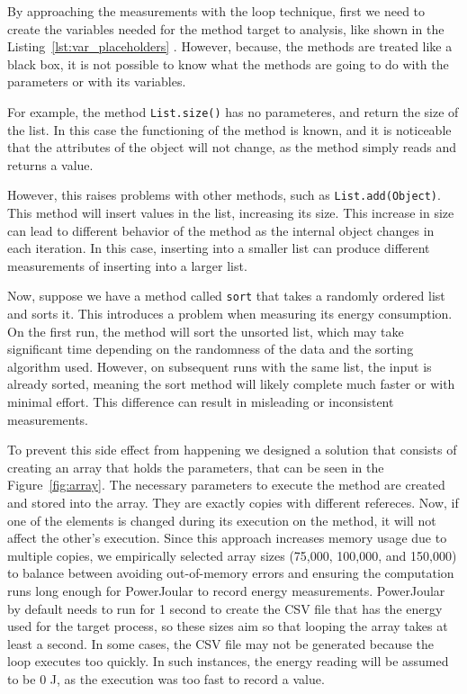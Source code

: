 By approaching the measurements with the loop technique, first we need to create the variables needed for the method target to analysis, like shown in the Listing~\ref{lst:var_placeholders} . However, because, the methods are treated like a black box, it is not possible to know what the methods are going to do with the parameters or with its variables. {\color{blue} For example, the method \texttt{List.size()} has no parameteres, and return the size of the list. In this case the functioning of the method is known, and it is noticeable that the attributes of the object will not change, as the method simply reads and returns a value.

However, this raises problems with other methods, such as \texttt{List.add(Object)}. This method will insert values in the list, increasing its size. This increase in size can lead to different behavior of the method as the internal object changes in each iteration. In this case, inserting into a smaller list can produce different measurements of inserting into a larger list.}

Now, suppose we have a method called \texttt{sort} that takes a randomly ordered list and sorts it. This introduces a problem when measuring its energy consumption. On the first run, the method will sort the unsorted list, which may take significant time depending on the randomness of the data and the sorting algorithm used. However, on subsequent runs with the same list, the input is already sorted, meaning the sort method will likely complete much faster or with minimal effort. This difference can result in misleading or inconsistent measurements.

To prevent this side effect from happening we designed a solution that consists of creating an array that holds the parameters, that can be seen in the Figure~\ref{fig:array}. The necessary parameters to execute the method are created and stored into the array. They are exactly copies with different refereces. Now, if one of the elements is changed during its execution on the method, it will not affect the other's execution. Since this approach increases memory usage due to multiple copies, we empirically selected array sizes (75,000, 100,000, and 150,000) to balance between avoiding out-of-memory errors and ensuring the computation runs long enough for PowerJoular to record energy measurements. PowerJoular by default needs to run for 1 second to create the CSV file that has the energy used for the target process, so these sizes aim so that looping the array takes at least a second. In some cases, the CSV file may not be generated because the loop executes too quickly. In such instances, the energy reading will be assumed to be 0 J, as the execution was too fast to record a value.


